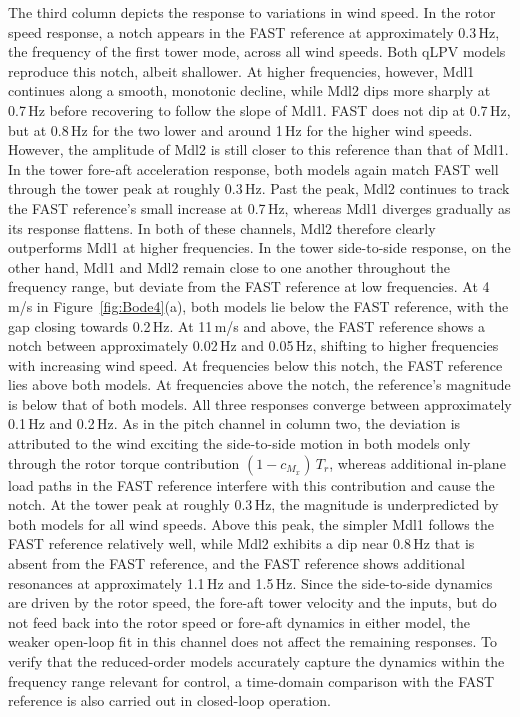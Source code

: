     The third column depicts the response to variations in wind speed. In the rotor speed response, a notch appears in the FAST reference at approximately 0.3\,Hz, the frequency of the first tower mode, across all wind speeds. Both qLPV models reproduce this notch, albeit shallower. At higher frequencies, however, Mdl1 continues along a smooth, monotonic decline, while Mdl2 dips more sharply at 0.7\,Hz before recovering to follow the slope of Mdl1. FAST does not dip at 0.7\,Hz, but at 0.8\,Hz for the two lower and around 1\,Hz for the higher wind speeds. However, the amplitude of Mdl2 is still closer to this reference than that of Mdl1. In the tower fore-aft acceleration response, both models again match FAST well through the tower peak at roughly 0.3\,Hz. Past the peak, Mdl2 continues to track the FAST reference's small increase at 0.7\,Hz, whereas Mdl1 diverges gradually as its response flattens. In both of these channels, Mdl2 therefore clearly outperforms Mdl1 at higher frequencies. In the tower side-to-side response, on the other hand, Mdl1 and Mdl2 remain close to one another throughout the frequency range, but deviate from the FAST reference at low frequencies. At 4\,m/s in Figure~\ref{fig:Bode4}(a), both models lie below the FAST reference, with the gap closing towards 0.2\,Hz. At 11\,m/s and above, the FAST reference shows a notch between approximately 0.02\,Hz and 0.05\,Hz, shifting to higher frequencies with increasing wind speed. At frequencies below this notch, the FAST reference lies above both models. At frequencies above the notch, the reference's magnitude is below that of both models. All three responses converge between approximately 0.1\,Hz and 0.2\,Hz. As in the pitch channel in column two, the deviation is attributed to the wind exciting the side-to-side motion in both models only through the rotor torque contribution $(1-c_{M_x})\,T_r$, whereas additional in-plane load paths in the FAST reference interfere with this contribution and cause the notch. At the tower peak at roughly 0.3\,Hz, the magnitude is underpredicted by both models for all wind speeds. Above this peak, the simpler Mdl1 follows the FAST reference relatively well, while Mdl2 exhibits a dip near 0.8\,Hz that is absent from the FAST reference, and the FAST reference shows additional resonances at approximately 1.1\,Hz and 1.5\,Hz. Since the side-to-side dynamics are driven by the rotor speed, the fore-aft tower velocity and the inputs, but do not feed back into the rotor speed or fore-aft dynamics in either model, the weaker open-loop fit in this channel does not affect the remaining responses. To verify that the reduced-order models accurately capture the dynamics within the frequency range relevant for control, a time-domain comparison with the FAST reference is also carried out in closed-loop operation.
    
